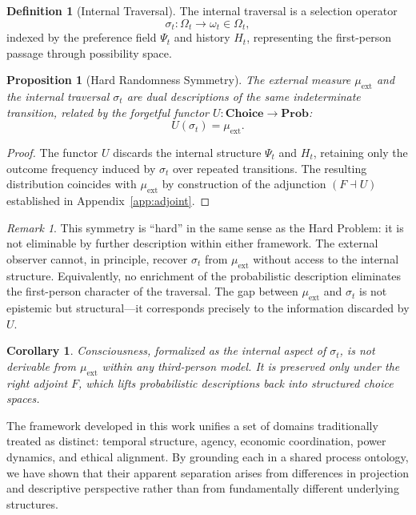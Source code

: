 \documentclass[11pt,a4paper]{article}
\newtheorem{proposition}[theorem]{Proposition}
\newtheorem{corollary}[theorem]{Corollary}
\theoremstyle{definition}
\newtheorem{definition}[theorem]{Definition}
\theoremstyle{remark}
\newtheorem{remark}[theorem]{Remark}
\begin{document}
\begin{definition}[Internal Traversal]
The internal traversal is a selection operator
\[
\sigma_t : \Omega_t \to \omega_t \in \Omega_t,
\]
indexed by the preference field $\Psi_t$ and history $H_t$, representing the first-person passage through possibility space.
\end{definition}

\begin{proposition}[Hard Randomness Symmetry]
The external measure $\mu_{\mathrm{ext}}$ and the internal traversal $\sigma_t$ are dual descriptions of the same indeterminate transition, related by the forgetful functor $U : \mathbf{Choice} \to \mathbf{Prob}$:
\[
U(\sigma_t) = \mu_{\mathrm{ext}}.
\]
\end{proposition}

\begin{proof}
The functor $U$ discards the internal structure $\Psi_t$ and $H_t$, retaining only the outcome frequency induced by $\sigma_t$ over repeated transitions. The resulting distribution coincides with $\mu_{\mathrm{ext}}$ by construction of the adjunction $(F \dashv U)$ established in Appendix~\ref{app:adjoint}.
\end{proof}

\begin{remark}
This symmetry is ``hard'' in the same sense as the Hard Problem: it is not eliminable by further description within either framework. The external observer cannot, in principle, recover $\sigma_t$ from $\mu_{\mathrm{ext}}$ without access to the internal structure. Equivalently, no enrichment of the probabilistic description eliminates the first-person character of the traversal. The gap between $\mu_{\mathrm{ext}}$ and $\sigma_t$ is not epistemic but structural---it corresponds precisely to the information discarded by $U$.
\end{remark}

\begin{corollary}
Consciousness, formalized as the internal aspect of $\sigma_t$, is not derivable from $\mu_{\mathrm{ext}}$ within any third-person model. It is preserved only under the right adjoint $F$, which lifts probabilistic descriptions back into structured choice spaces.
\end{corollary}



The framework developed in this work unifies a set of domains traditionally treated as distinct: temporal structure, agency, economic coordination, power dynamics, and ethical alignment. By grounding each in a shared process ontology, we have shown that their apparent separation arises from differences in projection and descriptive perspective rather than from fundamentally different underlying structures.
\end{document}
